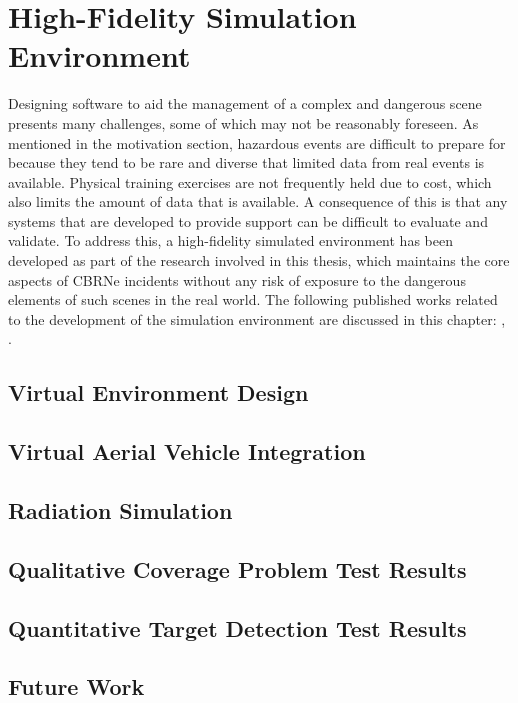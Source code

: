 \chapter{High-Fidelity Simulation Environment}
\placeholder{}
Designing software to aid the management of a complex and dangerous scene presents many challenges, some of which may not be reasonably foreseen. As mentioned in the motivation section, hazardous events are difficult to prepare for because they tend to be rare and diverse that limited data from real events is available. Physical training exercises are not frequently held due to cost, which also limits the amount of data that is available. A consequence of this is that any systems that are developed to provide support can be difficult to evaluate and validate. To address this, a high-fidelity simulated environment has been developed as part of the research involved in this thesis, which maintains the core aspects of CBRNe incidents without any risk of exposure to the dangerous elements of such scenes in the real world. The following published works related to the development of the simulation environment are discussed in this chapter: \cite{Smyth2017AInvestigation}, \cite{GEMDavidSmyth}.\par


\section{Virtual Environment Design}


\section{Virtual Aerial Vehicle Integration}

\section{Radiation Simulation}

\section{Qualitative Coverage Problem Test Results}

\section{Quantitative Target Detection Test Results}

\section{Future Work}